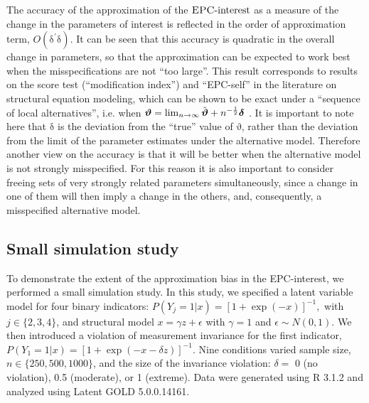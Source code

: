 \documentclass[letterpaper,12pt]{article}
\newcommand\vm[1]{%
\bm{\mathrm{#1}}}
\newcommand{\da}{\textrm{{\sc {EPC}}-interest}}
\begin{document}
The accuracy of the approximation of the $\da{}$ as a measure of the change in the parameters of interest is reflected in the order of approximation term, $O(\vm{\delta}^\prime\vm{\delta})$. It can be seen that this accuracy is quadratic in the overall change in parameters, so that the approximation can be expected to work best when the misspecifications are not ``too large''. This result corresponds to results on the score test (``modification index'') and ``EPC-self'' in the literature on structural equation modeling, which can be shown to be exact under a ``sequence of local alternatives'', i.e. when $\vm{\vartheta} = \lim_{n\rightarrow\infty} \hat{\vm{\vartheta}} + n^{-\frac{1}{2}}\vm{\delta}$ \citep[p. 135]{satorra1989alternative}.
It is important to note here that $\vm{\delta}$ is the deviation from the ``true'' value of $\vm{\vartheta}$, rather than the deviation from the limit of the parameter estimates under the alternative model. Therefore another view on the accuracy is that it will be better when the alternative model is not strongly misspecified. For this reason it is also important to consider freeing sets of very strongly related parameters simultaneously, since a change in one of them will then imply a change in the others, and, consequently, a misspecified alternative model.

\subsection{Small simulation study}
\label{sec:simulation}

To demonstrate the extent of the approximation bias in the EPC-interest, we performed a small simulation study. In this study, we specified a latent variable model for four binary indicators:
$
	P(Y_j = 1 | x) = [1 + \exp(-x)]^{-1},
$
with $j \in \{2,3,4\}$, and structural model
$
	x = \gamma z + \epsilon
$
with $\gamma = 1$ and $\epsilon \sim N(0, 1)$. We then introduced a violation of measurement invariance for the first indicator,
$
	P(Y_1 = 1 | x) = [1 + \exp(-x - \delta z)]^{-1}.
$
Nine conditions varied sample size, $n \in \{250, 500, 1000\}$, and the size of the invariance violation:  $\delta = $ 0 (no violation), 0.5 (moderate), or 1 (extreme). 
Data were generated using R 3.1.2 and analyzed using Latent GOLD 5.0.0.14161. 
\end{document}
